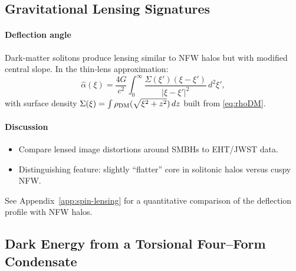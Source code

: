 \documentclass{article}
\begin{document}
\subsection{Gravitational Lensing Signatures}
\label{sec:lensing}
\paragraph{Deflection angle}
Dark‐matter solitons produce lensing similar to NFW halos but with modified central slope.  In the thin‐lens approximation:
\[
  \hat\alpha(\xi)
    = \frac{4G}{c^2}\int_0^\infty
      \frac{\Sigma(\xi')(\xi - \xi')}{|\xi-\xi'|^2}\,d^2\xi',
\]
with surface density $\Sigma(\xi)=\int\rho_{\rm DM}(\sqrt{\xi^2+z^2})\,dz$ built from \eqref{eq:rhoDM}.

\paragraph{Discussion}
\begin{itemize}
  \item Compare lensed image distortions around SMBHs to EHT/JWST data.  
  \item Distinguishing feature: slightly “flatter” core in solitonic halos versus cuspy NFW.  
\end{itemize}

\vspace{1ex}
\hrulefill

See Appendix~\ref{app:spin-lensing} for a quantitative comparison of the deflection profile with NFW halos.

\medskip
\begin{center}
\end{center}
\medskip

\subsection{Dark Energy from a Torsional Four--Form Condensate}
\label{sec:DE}
\end{document}
